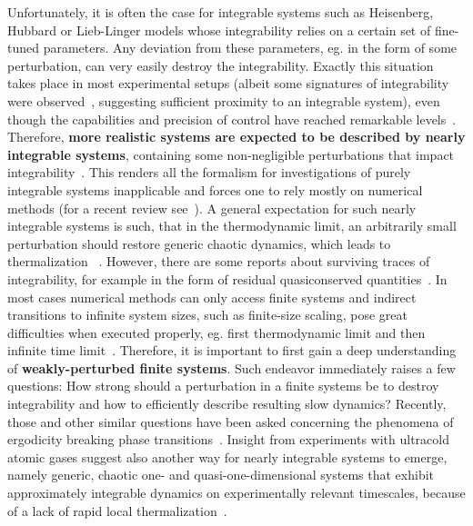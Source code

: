 Unfortunately, it is often the case for integrable systems such as Heisenberg, Hubbard or Lieb-Linger
models whose integrability relies on a certain set of fine-tuned parameters. Any deviation from these parameters, eg.
in the form of some perturbation, can very easily destroy the integrability. Exactly this situation takes place in most
experimental setups (albeit some signatures of integrability were observed~\autocite{Khemani2019}, suggesting sufficient
proximity to an integrable system),  even though the capabilities and precision of control have
reached remarkable levels~\autocite{Browaeys2020}. Therefore, \textbf{more realistic systems
    are expected to be described by nearly integrable systems}, containing some non-negligible perturbations that
impact integrability~\autocite{Zotos2004, Brandino2015}.
This renders all the formalism for investigations of purely
integrable systems inapplicable and forces one to rely mostly on numerical methods (for a recent review
see~\textcite{Bertini2021}).
A general expectation for such nearly integrable systems is such, that in the thermodynamic limit, an
arbitrarily small perturbation should restore generic chaotic dynamics, which leads to thermalization
~\autocite{LeBlond2021}. However, there
are some reports about surviving traces of integrability, for example in the form of residual quasiconserved
quantities~\autocite{Brandino2015}. In most cases numerical methods can only access finite
systems and indirect transitions to infinite system sizes, such as finite-size scaling, pose great difficulties
when executed properly, eg. first thermodynamic limit and then infinite time limit~\autocite{Sirker2014, CamposVenuti2010}.
Therefore, it is important to first gain a deep understanding of \textbf{weakly-perturbed finite systems}. Such
endeavor immediately raises a few questions: How strong should a perturbation in a finite
systems be to destroy integrability and how to efficiently describe resulting slow dynamics?
Recently, those and other similar questions have been asked concerning the phenomena of ergodicity breaking
phase transitions~\autocite{Suntajs2020,Suntajs2022}.
Insight from experiments with ultracold atomic gases suggest also another way for nearly integrable systems to emerge,
namely generic, chaotic one- and quasi-one-dimensional systems that exhibit approximately integrable dynamics on experimentally relevant timescales,
because of a lack of rapid local thermalization~\autocite{Polkovnikov2011, Gopalakrishnan2023}.

